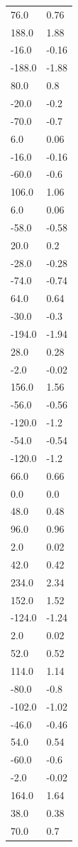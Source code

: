 \begin{longtable}{ll}
76.0 & 0.76 \\
188.0 & 1.88 \\
-16.0 & -0.16 \\
-188.0 & -1.88 \\
80.0 & 0.8 \\
-20.0 & -0.2 \\
-70.0 & -0.7 \\
6.0 & 0.06 \\
-16.0 & -0.16 \\
-60.0 & -0.6 \\
106.0 & 1.06 \\
6.0 & 0.06 \\
-58.0 & -0.58 \\
20.0 & 0.2 \\
-28.0 & -0.28 \\
-74.0 & -0.74 \\
64.0 & 0.64 \\
-30.0 & -0.3 \\
-194.0 & -1.94 \\
28.0 & 0.28 \\
-2.0 & -0.02 \\
156.0 & 1.56 \\
-56.0 & -0.56 \\
-120.0 & -1.2 \\
-54.0 & -0.54 \\
-120.0 & -1.2 \\
66.0 & 0.66 \\
0.0 & 0.0 \\
48.0 & 0.48 \\
96.0 & 0.96 \\
2.0 & 0.02 \\
42.0 & 0.42 \\
234.0 & 2.34 \\
152.0 & 1.52 \\
-124.0 & -1.24 \\
2.0 & 0.02 \\
52.0 & 0.52 \\
114.0 & 1.14 \\
-80.0 & -0.8 \\
-102.0 & -1.02 \\
-46.0 & -0.46 \\
54.0 & 0.54 \\
-60.0 & -0.6 \\
-2.0 & -0.02 \\
164.0 & 1.64 \\
38.0 & 0.38 \\
70.0 & 0.7 \\

\end{longtable}
